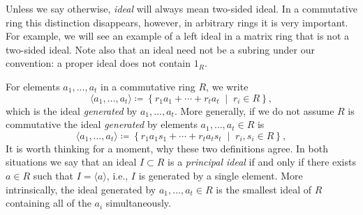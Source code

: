 \documentclass[12pt,reqno]{amsart}
\begin{document}
Unless we say otherwise, \emph{ideal} will always mean two-sided ideal. In a commutative ring this distinction disappears, however, in arbitrary rings it is very important. For example, we will see an example of a left ideal in a matrix ring that is not a two-sided ideal. Note also that an ideal need not be a subring under our convention: a proper ideal does not contain $1_R$.

For elements $a_1,\ldots,a_t$ in a commutative ring $R$, we write
\[
 \langle a_1,\ldots,a_t\rangle \coloneqq \left\{r_1a_1+\cdots+r_ta_t \;\; \big| \;\; r_i\in R\right \},
\]
which is the ideal \emph{generated} by $a_1,\ldots,a_t$. More generally, if we do not assume $R$ is commutative the ideal \emph{generated} by elements $a_1,\ldots,a_t \in R$ is
\[
 \langle a_1,\ldots,a_t\rangle \coloneqq \left\{r_1a_1s_1+\cdots+r_ta_ts_t \;\; \big| \;\; r_i,s_i\in R\right \},
\]
It is worth thinking for a moment, why these two definitions agree. In both situations we say that an ideal $I \subset R$ is a \emph{principal ideal} if and only if there exists $a\in R$ such that $I = \langle a \rangle$, i.e., $I$ is generated by a single element. More intrinsically, the ideal generated by $a_1,\ldots,a_t \in R$ is the smallest ideal of $R$ containing all of the $a_i$ simultaneously.

\hrulefill
\end{document}
